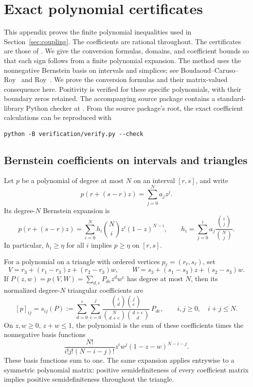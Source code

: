 \section{Exact polynomial certificates}\label{sec:certificates}

This appendix proves the finite polynomial inequalities used in
Section~\ref{sec:coupling}. The coefficients are rational throughout.
The certificates are those of \cite[Section~7]{OpenAI2026P}.
We give the conversion formulas, domains, and coefficient bounds so
that each sign follows from a finite polynomial expansion.
The method uses the nonnegative Bernstein basis on intervals and
simplices; see Boudaoud--Caruso--Roy~\cite{BoudaoudCarusoRoy2008} and
Roy~\cite[Sections~1 and~4]{Roy2007}. We prove the conversion formulas
and their matrix-valued consequence here. Positivity is verified for
these specific polynomials, with their boundary zeros retained.
The accompanying source package contains a standard-library Python
checker at . From the source package's root,
the exact coefficient calculations can be reproduced with
\begin{verbatim}
python -B verification/verify.py --check
\end{verbatim}

\subsection{Bernstein coefficients on intervals and triangles}

\begin{lemma}\label{lem:bernstein-conversion}
Let $p$ be a polynomial of degree at most $N$ on an interval $[r,s]$,
and write
\[
 p(r+(s-r)z)=\sum_{j=0}^N a_jz^j.
\]
Its degree-$N$ Bernstein expansion is
\[
 p(r+(s-r)z)=\sum_{i=0}^N h_i\binom Ni z^i(1-z)^{N-i},
 \qquad
 h_i=\sum_{j=0}^i a_j\frac{\binom ij}{\binom Nj}.
\]
In particular, $h_i\ge\eta$ for all $i$ implies $p\ge\eta$ on
$[r,s]$.

For a polynomial on a triangle with ordered vertices
$p_\ell=(r_\ell,s_\ell)$, set
\[
 V=r_3+(r_1-r_3)z+(r_2-r_3)w,\qquad
 W=s_3+(s_1-s_3)z+(s_2-s_3)w.
\]
If $P(z,w)=p(V,W)=\sum_{d,e}P_{de}z^dw^e$ has degree at most $N$,
then its normalized degree-$N$ triangular coefficients are
\[
 [p]_{ij}=s_{ij}(P):=
 \sum_{d=0}^i\sum_{e=0}^j
 \frac{\binom id\binom je}
      {\binom N{d+e}\binom{d+e}d}\,P_{de},
 \qquad i,j\ge0,\quad i+j\le N.
\]
On $z,w\ge0$, $z+w\le1$, the polynomial is the sum of these coefficients
times the nonnegative basis functions
\[
 \frac{N!}{i!j!(N-i-j)!}
       z^iw^j(1-z-w)^{N-i-j}.
\]
These basis functions sum to one. The same expansion applies entrywise
to a symmetric polynomial matrix: positive semidefiniteness of every
coefficient matrix implies positive semidefiniteness throughout the
triangle.
\end{lemma}

